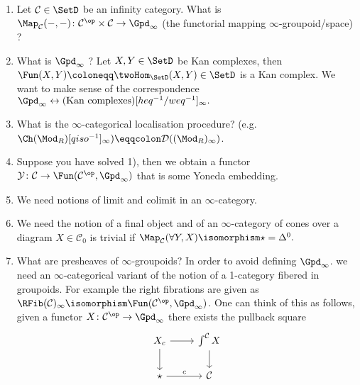 \begin{enumerate}
	\item 
	Let $ \mathcal{ C } \in \SetD $ be an infinity category. What is $ \Map_{ \mathcal{ C } } ( - , - ) \colon \mathcal{ C }^{ \op } \times \mathcal{ C } \to \Gpd_{ \infty } $ (the functorial mapping $ \infty $-groupoid/space) ?
	
	\item 
	What is $ \Gpd_\infty $ ?
	Let $ X , Y \in \SetD $ be Kan complexes, then $ \Fun ( X , Y ) \coloneqq \twoHom_{ \SetD } ( X , Y ) \in \SetD $ is a Kan complex.
	We want to make sense of the correspondence $ \Gpd_\infty \leftrightarrow ( \text{Kan complexes} ) [ heq^{ - 1 } / weq^{ - 1 } ]_\infty.$
	
	\item 
	What is the $ \infty $-categorical localisation procedure?
	(e.g. $\Ch ( \Mod_R ) [ qiso^{ -1 } ]_\infty ) \eqqcolon  \mathcal{ D } ( ( \Mod_R )_\infty ) $.
	
	\item 
	Suppose you have solved 1), then we obtain a functor $ \mathcal{ Y } \colon \mathcal{ C } \to \Fun ( \mathcal{ C }^{ \op } , \Gpd_{ \infty } ) $ that is some Yoneda embedding.
	
	\item 
	We need notions of limit and colimit in an $ \infty $-category.
	
	\item 
	We need the notion of a final object and of an $\infty$-category of cones over a diagram $ X \in \mathcal{ C }_0 $ is trivial if $ \Map_\mathcal{ C } ( \forall Y , X ) \isomorphism \star = \Delta^0.$
	
	\item 
	What are presheaves of $ \infty $-groupoids?
	In order to avoid defining $ \Gpd_\infty$. we need an $ \infty $-categorical variant of the notion of a 1-category fibered in groupoids.
	For example the right fibrations are given as $ \RFib ( \mathcal{ C } )_{ \infty } \isomorphism \Fun ( \mathcal{ C }^{ \op } , \Gpd_{ \infty } ) $. 
	One can think of this as follows, given a functor $ X \colon \mathcal{ C }^{ \op } \to \Gpd_{ \infty } $ there exists the pullback square
	\[
	\begin{tikzcd}
		X_c 
		\ar[d]
		\ar[r]
		&
		\int^\mathcal{ C } X
		\ar[d]
		\\
		\star
		\ar[r, "c"]
		&
		\mathcal{ C }
	\end{tikzcd}
	\]
\end{enumerate}


